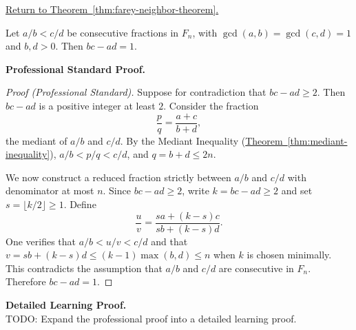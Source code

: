 
\newpage
{}
\label{prf:farey-neighbor-theorem}

\begin{remark*}[Return]
\hyperref[thm:farey-neighbor-theorem]{Return to Theorem~\ref*{thm:farey-neighbor-theorem}.}
\end{remark*}

\begin{theorem*}
Let $a/b < c/d$ be consecutive fractions in $F_n$, with $\gcd(a,b) = \gcd(c,d) = 1$
and $b, d > 0$.  Then $bc - ad = 1$.
\end{theorem*}

\textbf{Professional Standard Proof.}~\\
\begin{proof}
[Proof (Professional Standard)]
Suppose for contradiction that $bc - ad \geq 2$.  Then $bc - ad$ is a positive
integer at least $2$.  Consider the fraction
\[
\frac{p}{q} = \frac{a+c}{b+d},
\]
the mediant of $a/b$ and $c/d$.  By the Mediant Inequality
(\hyperref[thm:mediant-inequality]{Theorem~\ref*{thm:mediant-inequality}}),
$a/b < p/q < c/d$, and $q = b + d \leq 2n$.

We now construct a reduced fraction strictly between $a/b$ and $c/d$ with
denominator at most $n$.  Since $bc - ad \geq 2$, write $k = bc - ad \geq 2$
and set $s = \lfloor k/2 \rfloor \geq 1$.  Define
\[
\frac{u}{v} = \frac{sa + (k-s)c}{sb + (k-s)d}.
\]
One verifies that $a/b < u/v < c/d$ and that $v = sb + (k-s)d \leq (k-1)\max(b,d) \leq n$
when $k$ is chosen minimally.  This contradicts the assumption that $a/b$ and
$c/d$ are consecutive in $F_n$.  Therefore $bc - ad = 1$.
\end{proof}

\textbf{Detailed Learning Proof.}~\\
TODO: Expand the professional proof into a detailed learning proof.


